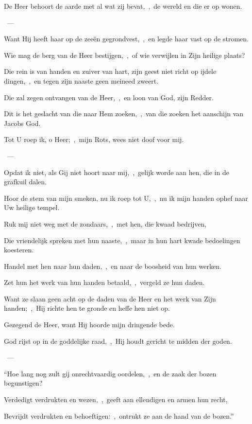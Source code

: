 \documentclass[12pt,twoside,a5paper]{article}
\begin{document}
\begin{halfparskip}
    De Heer behoort de aarde met al wat zij bevat,~\sep\ de wereld en die er op wonen.

  ~--- 

  Want Hij heeft haar op de zeeën gegrondvest,~\sep\ en legde haar vast op de stromen.

  Wie mag de berg van de Heer bestijgen,~\sep\ of wie verwijlen in Zijn heilige plaats?

  Die rein is van handen en zuiver van hart, zijn geest niet richt op ijdele dingen,~\sep\ en tegen zijn naaste geen meineed zweert.

  Die zal zegen ontvangen van de Heer,~\sep\ en loon van God, zijn Redder.

  Dit is het geslacht van die naar Hem zoeken,~\sep\ van die zoeken het aanschijn van Jacobs God.
\end{halfparskip}

\begin{halfparskip}
    Tot U roep ik, o Heer;~\sep\ mijn Rots, wees niet doof voor mij.

  ~--- 

  Opdat ik niet, als Gij niet hoort naar mij,~\sep\ gelijk worde aan hen, die in de grafkuil dalen.

  Hoor de stem van mijn smeken, nu ik roep tot U,~\sep\ nu ik mijn handen ophef naar Uw heilige tempel.

  Ruk mij niet weg met de zondaars,~\sep\ met hen, die kwaad bedrijven,

  Die vriendelijk spreken met hun naaste,~\sep\ maar in hun hart kwade bedoelingen koesteren.

  Handel met hen naar hun daden,~\sep\ en naar de boosheid van hun werken.

  Zet hun het werk van hun handen betaald,~\sep\ vergeld ze hun daden.

  Want ze slaan geen acht op de daden van de Heer en het werk van Zijn handen;~\sep\ Hij richte hen te gronde en heffe hen niet op.

  Gezegend de Heer, want Hij hoorde mijn dringende bede.
\end{halfparskip}

\begin{halfparskip}
    God rijst op in de goddelijke raad,~\sep\ Hij houdt gericht te midden der goden.

  ~--- 

  ``Hoe lang nog zult gij onrechtvaardig oordelen,~\sep\ en de zaak der bozen begunstigen?

  Verdedigt verdrukten en wezen,~\sep\ geeft aan ellendigen en armen hun recht,

  Bevrijdt verdrukten en behoeftigen:~\sep\ ontrukt ze aan de hand van de bozen.''
\end{halfparskip}
\end{document}
